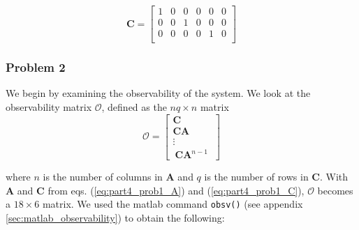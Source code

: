 \begin{equation} \label{eq:part4_prob1_C}
    \bm{C} = 
	\begin{bmatrix}
		1   & 0   & 0   & 0   & 0   & 0 \\
		0   & 0   & 1   & 0   & 0   & 0 \\
		0   & 0   & 0   & 0   & 1   & 0 \\
	\end{bmatrix}
\end{equation} 




\subsubsection{Problem 2}

We begin by examining the observability of the system. We look at the observability matrix $\mathcal{O}$, defined as the $nq \times n$ matrix 
\begin{equation}
\mathcal{O} = 
    \begin{bmatrix}
        \bm{C} \\
        \bm{C} \bm{A} \\
        \vdots \\
        \ \bm{C} \bm{A}^{n-1} \ 
    \end{bmatrix}
\end{equation}

where $n$ is the number of columns in $\bm{A}$ and $q$ is the number of rows in $\bm{C}$. With $\bm{A}$ and $\bm{C}$ from eqs. (\ref{eq:part4_prob1_A}) and (\ref{eq:part4_prob1_C}), $\mathcal{O}$ becomes a $18 \times 6$ matrix. We used the matlab command \texttt{obsv()} (see appendix \ref{sec:matlab_observability}) to obtain the following:

